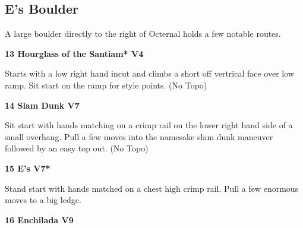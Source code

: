 \begin{multicols}{2}
\begin{minipage}{\columnwidth}
			\subsection*{E's Boulder}\label{bf:E's Boulder}
			A large boulder directly to the right of Octernal holds a few notable routes.
			
			\end{minipage}
			
					\begin{minipage}{\linewidth}	
					\label{rt:Hourglass of the Santiam}
\colorbox{RoyalBlue!20}{
\parbox{0.95\textwidth}{
\textbf{
13 Hourglass of the Santiam* V4    
}
}
}

					\begin{adjustwidth}{0.5cm}{}				
					Starts with a low right hand incut and climbs a short off vertrical face over low ramp. Sit start on the ramp for style points.
						\newline (No Topo) 
					\end{adjustwidth}
					\end{minipage}
					\begin{minipage}{\linewidth}	
					\label{rt:Slam Dunk}
\colorbox{Goldenrod!50}{
\parbox{0.95\textwidth}{
\textbf{
14 Slam Dunk V7  
}
}
}

					\begin{adjustwidth}{0.5cm}{}				
					Sit start with hands matching on a crimp rail on the lower right hand side of a small overhang. Pull a few moves into the namesake slam dunk maneuver followed by an easy top out.
						\newline (No Topo) 
					\end{adjustwidth}
					\end{minipage}
					\begin{minipage}{\linewidth}	
					\label{rt:E's}
\colorbox{Goldenrod!50}{
\parbox{0.95\textwidth}{
\textbf{
15 E's V7*  
}
}
}

					\begin{adjustwidth}{0.5cm}{}				
					Stand start with hands matched on a chest high crimp rail. Pull a few enormous moves to a big ledge.
					\end{adjustwidth}
					\end{minipage}

					\begin{minipage}{\linewidth}	
					\label{rt:Enchilada}
\colorbox{Goldenrod!50}{
\parbox{0.95\textwidth}{
\textbf{
16 Enchilada V9    
}
}
}


\end{minipage}
\end{multicols}
